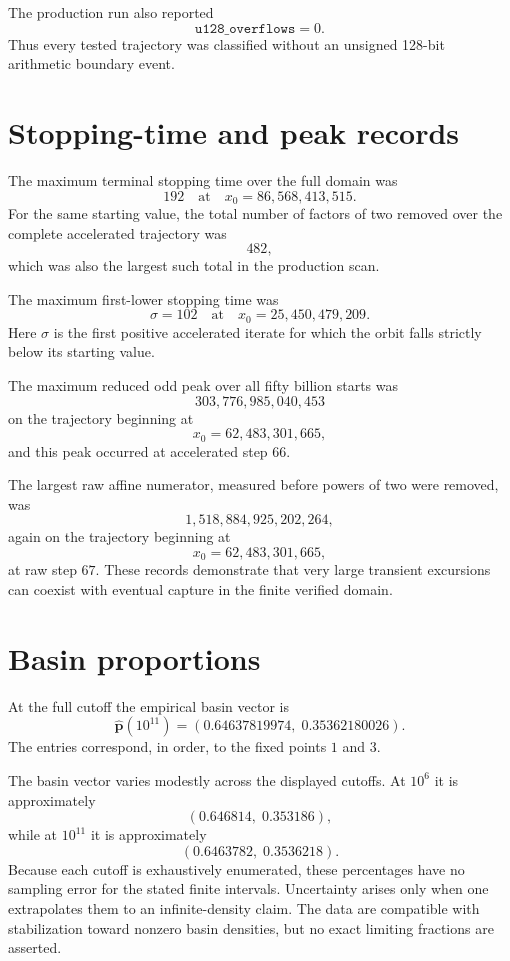 \documentclass[11pt]{article}
\begin{document}
The production run also reported
\[
\texttt{u128\_overflows}=0.
\]
Thus every tested trajectory was classified without an unsigned 128-bit arithmetic boundary event.

\section{Stopping-time and peak records}

The maximum terminal stopping time over the full domain was
\[
192
\quad\text{at}\quad
x_0=86,568,413,515.
\]
For the same starting value, the total number of factors of two removed over the complete accelerated trajectory was
\[
482,
\]
which was also the largest such total in the production scan.

The maximum first-lower stopping time was
\[
\sigma=102
\quad\text{at}\quad
x_0=25,450,479,209.
\]
Here $\sigma$ is the first positive accelerated iterate for which the orbit falls strictly below its starting value.

The maximum reduced odd peak over all fifty billion starts was
\[
303,776,985,040,453
\]
on the trajectory beginning at
\[
x_0=62,483,301,665,
\]
and this peak occurred at accelerated step $66$.

The largest raw affine numerator, measured before powers of two were removed, was
\[
1,518,884,925,202,264,
\]
again on the trajectory beginning at
\[
x_0=62,483,301,665,
\]
at raw step $67$. These records demonstrate that very large transient excursions can coexist with eventual capture in the finite verified domain.

\section{Basin proportions}

At the full cutoff the empirical basin vector is
\begin{equation}
\widehat{\mathbf p}(10^{11})
=
(0.64637819974,\;0.35362180026).
\end{equation}
The entries correspond, in order, to the fixed points $1$ and $3$.

The basin vector varies modestly across the displayed cutoffs. At $10^6$ it is approximately
\[
(0.646814,\;0.353186),
\]
while at $10^{11}$ it is approximately
\[
(0.6463782,\;0.3536218).
\]
Because each cutoff is exhaustively enumerated, these percentages have no sampling error for the stated finite intervals. Uncertainty arises only when one extrapolates them to an infinite-density claim. The data are compatible with stabilization toward nonzero basin densities, but no exact limiting fractions are asserted.
\end{document}
